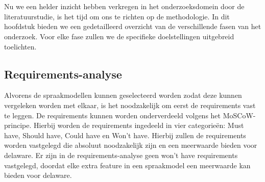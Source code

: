 
\chapter{}%
\label{ch:methodologie}



Nu we een helder inzicht hebben verkregen in het onderzoeksdomein door de literatuurstudie, is het tijd om ons te richten op de methodologie. In dit hoofdstuk bieden we een gedetailleerd overzicht van de verschillende fasen van het onderzoek. Voor elke fase zullen we de specifieke doelstellingen uitgebreid toelichten.

\section{Requirements-analyse}
Alvorens de spraakmodellen kunnen geselecteerd worden zodat deze kunnen vergeleken worden met elkaar, is het noodzakelijk om eerst de requirements vast te leggen. De requirements kunnen worden onderverdeeld volgens het MoSCoW-principe. Hierbij worden de requirements ingedeeld in vier categorieën: Must have, Should have, Could have en Won't have. Hierbij zullen de requirements worden vastgelegd die absoluut noodzakelijk zijn en een meerwaarde bieden voor delaware. Er zijn in de requirements-analyse geen won't have requirements vastgelegd, doordat elke extra feature in een spraakmodel een meerwaarde kan bieden voor delaware.

